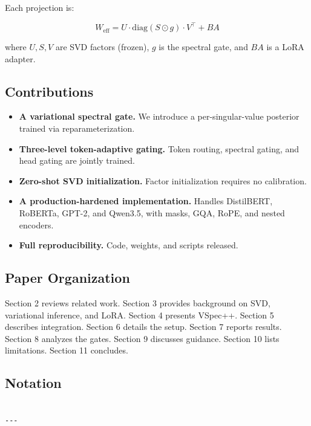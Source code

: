 Each projection is:

\[
W_\text{eff} = U \cdot \text{diag}(S \odot g) \cdot V^\top + B A
\tag{1.6}
\]

where $U, S, V$ are SVD factors (frozen), $g$ is the spectral gate, and 
$B A$ is a LoRA adapter.

\subsection{Contributions}

\begin{itemize}
\item \textbf{A variational spectral gate.} We introduce a per-singular-value
  posterior trained via reparameterization.
\item \textbf{Three-level token-adaptive gating.} Token routing, spectral gating,
  and head gating are jointly trained.
\item \textbf{Zero-shot SVD initialization.} Factor initialization requires no
  calibration.
\item \textbf{A production-hardened implementation.} Handles DistilBERT, RoBERTa,
  GPT-2, and Qwen3.5, with masks, GQA, RoPE, and nested encoders.
\item \textbf{Full reproducibility.} Code, weights, and scripts released.

\end{itemize}
\subsection{Paper Organization}

Section 2 reviews related work. Section 3 provides background on SVD, 
variational inference, and LoRA. Section 4 presents VSpec++. Section 5 
describes integration. Section 6 details the setup. Section 7 reports 
results. Section 8 analyzes the gates. Section 9 discusses guidance. 
Section 10 lists limitations. Section 11 concludes.



\subsection{Notation}

\begin{lstlisting}

---
\end{lstlisting}